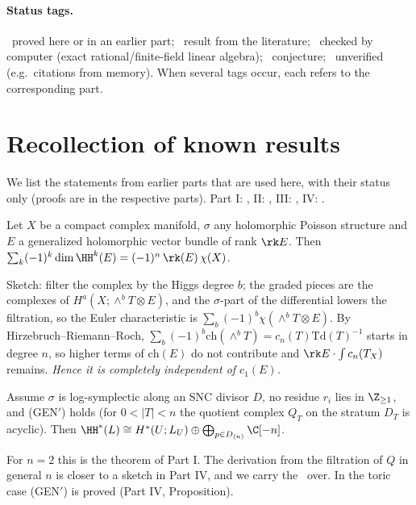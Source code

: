 \paragraph{Status tags.} \tP\ proved here or in an earlier part; \tC\ result from the literature; \tV\ checked by computer (exact rational/finite-field linear algebra); \tK\ conjecture; \tQ\ unverified (e.g.\ citations from memory). When several tags occur, each refers to the corresponding part.

\section{Recollection of known results}\label{sec:recall}
We list the statements from earlier parts that are used here, with their status only (proofs are in the respective parts). Part I: \cite{PartI}, II: \cite{PartII}, III: \cite{PartIII}, IV: \cite{PartIV}.

\begin{thm}\label{thm:E}
Let $X$ be a compact complex manifold, $\sigma$ any holomorphic Poisson structure and $E$ a generalized holomorphic vector bundle of rank $\rk E$. Then $\sum_k(-1)^k\dim\HH^k(E)=(-1)^n\,\rk(E)\,\chi(X)$.
\end{thm}
Sketch: filter the complex by the Higgs degree $b$; the graded pieces are the complexes of $H^a(X;\wedge^bT\otimes E)$, and the $\sigma$-part of the differential lowers the filtration, so the Euler characteristic is $\sum_b(-1)^b\chi(\wedge^bT\otimes E)$. By Hirzebruch--Riemann--Roch, $\sum_b(-1)^b\mathrm{ch}(\wedge^bT)=c_n(T)\mathrm{Td}(T)^{-1}$ starts in degree $n$, so higher terms of $\mathrm{ch}(E)$ do not contribute and $\rk E\cdot\int c_n(T_X)$ remains. \emph{Hence it is completely independent of $c_1(E)$.}

\begin{thm}\label{thm:R}
Assume $\sigma$ is log-symplectic along an SNC divisor $D$, no residue $r_i$ lies in $\Z_{\ge1}$, and (GEN$'$) holds (for $0<|T|<n$ the quotient complex $Q_T$ on the stratum $D_T$ is acyclic). Then $\HH^*(L)\cong H^*(U;L_U)\oplus\bigoplus_{p\in D_{(n)}}\C[-n]$.
\end{thm}
For $n=2$ this is the theorem of Part I. The derivation from the filtration of $Q$ in general $n$ is closer to a sketch in Part IV, and we carry the \tQ\ over. In the toric case (GEN$'$) is proved (Part IV, Proposition).

